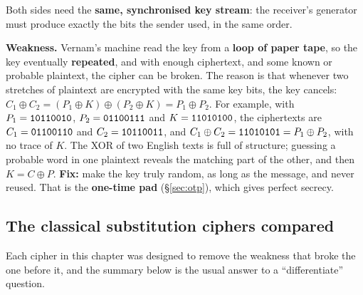 \begin{center}
\end{center}
Both sides need the \textbf{same, synchronised key stream}: the receiver's generator must produce exactly the bits the sender used, in the same order.

\textbf{Weakness.} Vernam's machine read the key from a \textbf{loop of paper tape}, so the key eventually \textbf{repeated}, and with enough ciphertext, and some known or probable plaintext, the cipher can be broken. The reason is that whenever two stretches of plaintext are encrypted with the same key bits, the key cancels: $C_1 \oplus C_2 = (P_1 \oplus K) \oplus (P_2 \oplus K) = P_1 \oplus P_2$. For example, with $P_1 = \texttt{10110010}$, $P_2 = \texttt{01100111}$ and $K = \texttt{11010100}$, the ciphertexts are $C_1 = \texttt{01100110}$ and $C_2 = \texttt{10110011}$, and $C_1 \oplus C_2 = \texttt{11010101} = P_1 \oplus P_2$, with no trace of $K$. The XOR of two English texts is full of structure; guessing a probable word in one plaintext reveals the matching part of the other, and then $K = C \oplus P$.
\textbf{Fix:} make the key truly random, as long as the message, and never reused. That is the \textbf{one-time pad} (\S\ref{sec:otp}), which gives perfect secrecy.

\subsection{The classical substitution ciphers compared}
Each cipher in this chapter was designed to remove the weakness that broke the one before it, and the summary below is the usual answer to a ``differentiate'' question.

